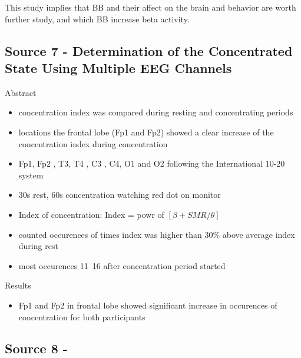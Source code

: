 \documentclass[a4paper]{article}
\begin{document}
This study implies that BB and their affect on the brain and behavior are worth further study, and which BB increase beta activity.


\subsection*{Source 7 - Determination of the Concentrated State Using Multiple EEG Channels}

Abstract
\begin{itemize}
    \item concentration index was compared during resting and concentrating periods
    \item locations the frontal lobe (Fp1 and Fp2) showed a clear increase of the concentration index during concentration
    \item Fp1, Fp2 , T3, T4 , C3 , C4, O1 and O2 following the International 10-20 system
    \item 30s rest, 60s concentration watching red dot on monitor
    \item Index of concentration: Index = powr of $[{\beta + SMR} / \theta]$
    \item counted occurences of times index was higher than 30\% above average index during rest
    \item most occurences 11~16 after concentration period started
\end{itemize}

Results
\begin{itemize}
    \item Fp1 and Fp2 in frontal lobe showed significant increase in occurences of concentration for both participants
\end{itemize}

\subsection*{Source 8 - }
\end{document}
